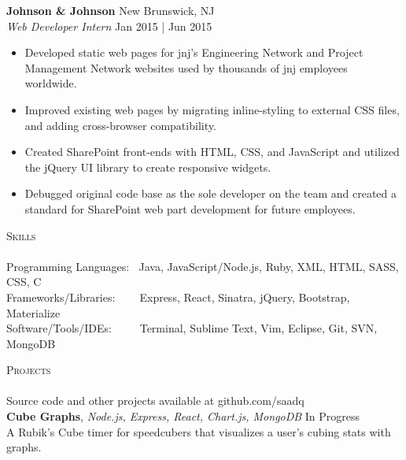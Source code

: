 \documentclass{article}
\newcommand{\lineunder} {
    \vspace*{-8pt} \\
    \hspace*{-18pt} \hrulefill \\
}
\newcommand{\header} [1] {
    {\hspace*{-18pt}\vspace*{6pt} \textsc{#1}}
    \vspace*{-6pt} \lineunder
}
\begin{document}
        {\textbf{Johnson \& Johnson} \hfill New Brunswick, NJ \\
        \textit{Web Developer Intern} \hfill Jan 2015 | Jun 2015
        \vspace{-1mm}
        \begin{itemize} \itemsep 1pt
            \item Developed static web pages for jnj's Engineering Network and Project Management Network websites used by thousands of jnj employees worldwide.
            \item Improved existing web pages by migrating inline-styling to external CSS files, and adding cross-browser compatibility.
            \item Created SharePoint front-ends with HTML, CSS, and JavaScript and utilized the jQuery UI library to create responsive widgets.
            \item Debugged original code base as the sole developer on the team and created a standard for SharePoint web part development for future employees.
        \end{itemize}



    \header{Skills}

    {Programming Languages:} $\:$ Java, JavaScript/Node.js, Ruby, XML, HTML, SASS, CSS, C \vspace{1mm}
    {\\Frameworks/Libraries:} $\:$ $\:$ $\:$ $\:$Express, React, Sinatra, jQuery, Bootstrap, Materialize\vspace{1mm}
    {\\Software/Tools/IDEs:} $\:$ $\:$ $\:$ $\:$ Terminal, Sublime Text, Vim, Eclipse, Git, SVN, MongoDB

    \vspace{4mm}


    \header{Projects}
    Source code and other projects available at github.com/saadq \\
    \vspace{2mm}
    {\textbf{Cube Graphs}, \sl Node.js, Express, React, Chart.js, MongoDB}  \hfill In Progress  \\
    A Rubik's Cube timer for speedcubers that visualizes a user's cubing stats with graphs.  \\

}
\end{document}
